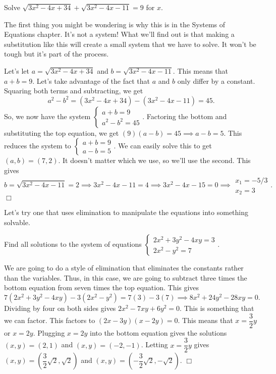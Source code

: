 \documentclass[lang=en,11pt]{elegantbook}
\begin{document}
\begin{example}
Solve $\sqrt{3x^2-4x+34}+\sqrt{3x^2-4x-11}=9$ for $x$.
\end{example}
\begin{solution}
The first thing you might be wondering is why this is in the Systems of Equations chapter.  It's not a system!  What we'll find out is that making a substitution like this will create a small system that we have to solve.  It won't be tough but it's part of the process.

Let's let $a=\sqrt{3x^2-4x+34}$ and $b=\sqrt{3x^2-4x-11}$.  This means that $a+b=9$.  Let's take advantage of the fact that $a$ and $b$ only differ by a constant.  Squaring both terms and subtracting, we get $$a^2-b^2=(3x^2-4x+34)-(3x^2-4x-11)=45.$$  So, we now have the system $\begin{cases} a+b=9 \\ a^2-b^2=45 \end{cases}$.  Factoring the bottom and substituting the top equation, we get $(9)(a-b)=45 \implies a-b=5$.  This reduces the system to $\begin{cases} a+b=9 \\ a-b=5 \end{cases}$.  We can easily solve this to get $(a,b)=(7,2)$.  It doesn't matter which we use, so we'll use the second.  This gives $$b=\sqrt{3x^2-4x-11}=2 \implies 3x^2-4x-11=4 \implies 3x^2-4x-15=0 \implies \begin{matrix} x_1=-5/3 \\ x_2=3 \end{matrix}.$$$\Box$
\end{solution}
Let's try one that uses elimination to manipulate the equations into something solvable.
\begin{example}
Find all solutions to the system of equations $\begin{cases} 2x^2+3y^2-4xy=3 \\ 2x^2-y^2=7 \end{cases}$.
\end{example}
\begin{solution}
We are going to do a style of elimination that eliminates the constants rather than the variables.  Thus, in this case, we are going to subtract three times the bottom equation from seven times the top equation.  This gives $$7(2x^2+3y^2-4xy)-3(2x^2-y^2)=7(3)-3(7) \implies 8x^2+24y^2-28xy=0.$$  Dividing by four on both sides gives $2x^2-7xy+6y^2=0.$  This is something that we can factor.  This factors to $(2x-3y)(x-2y)=0$.  This means that $x=\dfrac{3}{2}y$ or $x=2y$.  Plugging $x=2y$ into the bottom equation gives the solutions $(x,y)=(2,1)$ and $(x,y)=(-2,-1)$.  Letting $x=\dfrac{3}{2}y$ gives $(x,y)=\left(\dfrac{3}{2}\sqrt{2},\sqrt{2}\right)$ and $(x,y)=\left(-\dfrac{3}{2}\sqrt{2},-\sqrt{2}\right)$.  $\Box$
\end{solution}
\end{document}
